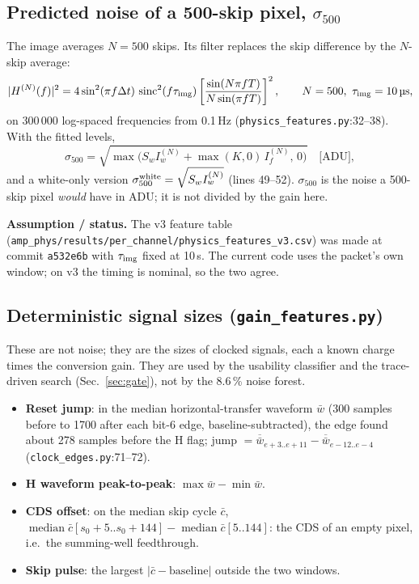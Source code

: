 \documentclass[10pt,a4paper]{article}
\newcommand{\code}[1]{\texttt{\small #1}}
\newcommand{\sinc}{\operatorname{sinc}}
\newcommand{\med}{\operatorname{median}}
\newcommand{\caveat}[1]{\par\smallskip\noindent\colorbox{orange!10}{\parbox{\dimexpr\linewidth-2\fboxsep}{\small\textbf{Assumption / status.} #1}}\par\smallskip}
\begin{document}
\subsection{Predicted noise of a 500-skip pixel, $\sigma_{500}$}
The image averages $N=500$ skips. Its filter replaces the skip difference by the $N$-skip average:
\begin{equation}
|H^{(N)}(f)|^2=4\sin^2(\pi f\Delta t)\,\sinc^2(f\tau_{\rm img})\left[\frac{\sin(N\pi fT)}{N\sin(\pi fT)}\right]^2,
\qquad N=500,\ \tau_{\rm img}=10\,\text{\textmu s},
\end{equation}
on 300\,000 log-spaced frequencies from 0.1\,Hz (\code{physics\_features.py}:32--38). With the fitted levels,
\begin{equation}
\sigma_{500}=\sqrt{\max\!\big(S_w I_w^{(N)}+\max(K,0)\,I_f^{(N)},\,0\big)}\quad\text{[ADU]},
\label{eq:s500}
\end{equation}
and a white-only version $\sigma_{500}^{\rm white}=\sqrt{S_wI_w^{(N)}}$ (lines 49--52). $\sigma_{500}$ is the
noise a 500-skip pixel \emph{would} have in ADU; it is not divided by the gain here.

\caveat{The v3 feature table (\code{amp\_phys/results/per\_channel/physics\_features\_v3.csv}) was made at commit
\code{a532e6b} with $\tau_{\rm img}$ fixed at 10\,\textmu s. The current code uses the packet's own window; on v3 the timing
is nominal, so the two agree.}

\subsection{Deterministic signal sizes (\code{gain\_features.py})}\label{sec:gainfeat}
These are not noise; they are the sizes of clocked signals, each a known charge times the conversion gain. They are used
by the usability classifier and the trace-driven search (Sec.~\ref{sec:gate}), not by the 8.6\,\% noise forest.
\begin{itemize}
\item \textbf{Reset jump}: in the median horizontal-transfer waveform $\bar w$ (300 samples before to 1700 after each bit-6 edge,
  baseline-subtracted), the edge found about 278 samples before the H flag; jump $=\overline{\bar w}_{e+3..e+11}-\overline{\bar w}_{e-12..e-4}$
  (\code{clock\_edges.py}:71--72).
\item \textbf{H waveform peak-to-peak}: $\max\bar w-\min\bar w$.
\item \textbf{CDS offset}: on the median skip cycle $\bar c$, $\med\bar c[s_0+5..s_0+144]-\med\bar c[5..144]$: the CDS of an
  empty pixel, i.e.\ the summing-well feedthrough.
\item \textbf{Skip pulse}: the largest $|\bar c-\text{baseline}|$ outside the two windows.
\end{itemize}
\end{document}
